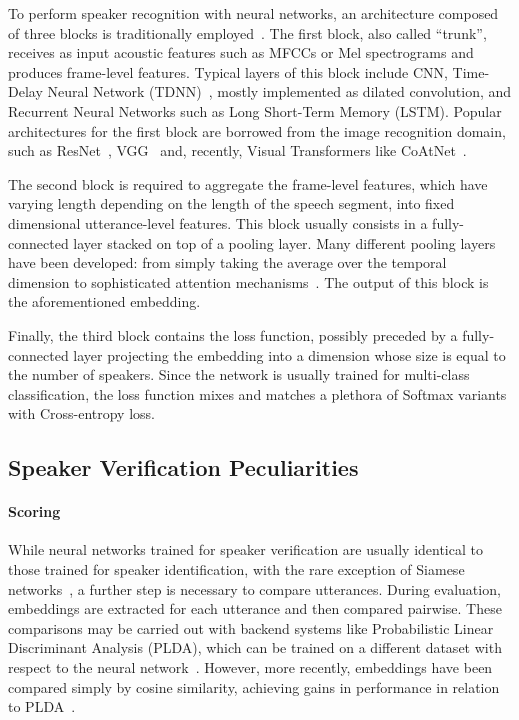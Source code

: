 \documentclass[conference]{IEEEtran}
\begin{document}
To perform speaker recognition with neural networks, an architecture composed of three blocks is traditionally employed~\cite{okabe2018asp}. The first block, also called ``trunk'', receives as input acoustic features such as MFCCs or Mel spectrograms and produces frame-level features. Typical layers of this block include CNN, Time-Delay Neural Network (TDNN)~\cite{peddinti2015timedelay,waibel1989timedelay}, mostly implemented as dilated convolution, and Recurrent Neural Networks such as Long Short-Term Memory (LSTM). Popular architectures for the first block are borrowed from the image recognition domain, such as ResNet~\cite{he2016resnet}, VGG~\cite{simonyan2014vgg} and, recently, Visual Transformers like CoAtNet~\cite{dai2021coatnet}. 

The second block is required to aggregate the frame-level features, which have varying length depending on the length of the speech segment, into fixed dimensional utterance-level features. This block usually consists in a fully-connected layer stacked on top of a pooling layer. Many different pooling layers have been developed: from simply taking the average over the temporal dimension to sophisticated attention mechanisms~\cite{cai2018exploring}. The output of this block is the aforementioned embedding.

Finally, the third block contains the loss function, possibly preceded by a fully-connected layer projecting the embedding into a dimension whose size is equal to the number of speakers. Since the network is usually trained for multi-class classification, the loss function mixes and matches a plethora of Softmax variants with Cross-entropy loss.


\subsection{Speaker Verification Peculiarities}

\paragraph{Scoring}While neural networks trained for speaker verification are usually identical to those trained for speaker identification, with the rare exception of Siamese networks~\cite{hajavi2021siamese}, a further step is necessary to compare utterances. During evaluation, embeddings are extracted for each utterance and then compared pairwise. These comparisons may be carried out with backend systems like Probabilistic Linear Discriminant Analysis (PLDA), which can be trained on a different dataset with respect to the neural network~\cite{snyder2017deep}. However, more recently, embeddings have been compared simply by cosine similarity, achieving gains in performance in relation to PLDA~\cite{cai2018exploring}.
\end{document}
